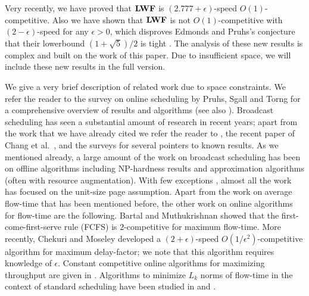 \documentclass[11pt]{article}
\newcommand{\etal}{et al.\ }
\newcommand{\eps}{\epsilon}
\newcommand{\spone}{-3.5mm}
\begin{document}
\begin{titlepage}
\iffalse
 In this paper we assume, for simplicity, the discrete unit-time slot model.  In this model, all requests arrive at
integer times; the algorithm and adversary make scheduling decisions at the beginning of each time slot. Each page take
unit-time to transmit; hence a request $(p,i)$ that is satisfied by a transmission of $p$ in time slot $t$ has a finish
time $t+1$.  For the most part, we assume for simplicity of exposition, that the algorithm is given an integer speed
$s$ which implies that the algorithm schedules (at most) $s$ requests in each time slot. We indicate, where necessary,
how the analysis extends to non-integer speeds. See \cite{EdmondsP04} for more discussion on discrete time versus
continuous time models. \fi

 Very recently, we
have proved that ${\texttt{\bf{LWF}}}$ is $(2.777 + \eps)$-speed $O(1)$-competitive. 
Also we have shown that ${\texttt{\bf{LWF}}}$ is
not $O(1)$-competitive with $(2- \eps)$-speed for any $\eps>0$, 
which disproves Edmonds and Pruhs's conjecture that 
their lowerbound $(1 + \sqrt{5})/2$
is tight \cite{EdmondsP04}.
The analysis of these new results is complex and
built on the work of this paper. 
Due to insufficient space, we will
include these new results in the full version. 

\medskip
{} We give a very brief description of
related work due to space constraints. We refer the reader to the
survey on online scheduling by Pruhs, Sgall and Torng \cite{PruhsST}
for a comprehensive overview of results and algorithms (see also
\cite{Pruhs07}).  Broadcast scheduling has seen a substantial amount
of research in recent years; apart from the work that we have already
cited we refer the reader to
\cite{KalyanasundaramPV00,CharikarK06,KhullerK04}, the recent paper of
Chang \etal \cite{ChangEGK08}, and the surveys \cite{PruhsST,Pruhs07}
for several pointers to known results.  As we mentioned already, a
large amount of the work on broadcast scheduling has been on offline
algorithms including NP-hardness results and approximation algorithms
(often with resource augmentation). With few exceptions
\cite{EdmondsP03}, almost all the work has focused on the unit-size
page assumption. Apart from the work on average flow-time that has
been mentioned before, the other work on online algorithms for
flow-time are the following. Bartal and Muthukrishnan
\cite{BartalM00,ChangEGK08} showed that the first-come-first-serve
rule (FCFS) is $2$-competitive for maximum flow-time. More recently,
Chekuri and Moseley \cite{ChekuriM09} developed a $(2+\eps)$-speed
$O(1/\eps^2)$-competitive algorithm for maximum delay-factor; we note
that this algorithm requires knowledge of $\epsilon$. Constant
competitive online algorithms for maximizing throughput are given in
\cite{Kimc04,ChanLTW04,ZhengFCCPW06,ChrobakDJKK06}. Algorithms to
minimize $L_k$ norms of flow-time in the context of standard
scheduling have been studied in \cite{BansalP03} and
\cite{ChekuriGKK04}. \vspace{\spone}


\end{titlepage}
\end{document}
